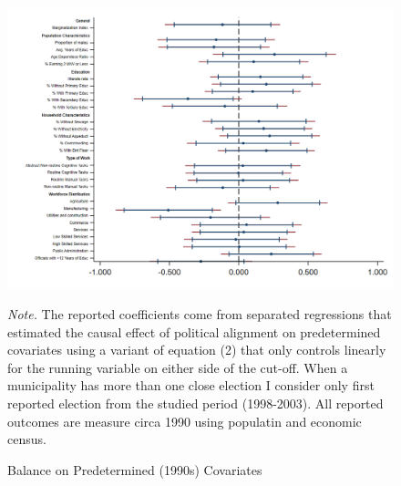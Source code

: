 \documentclass[dv_diss_main.tex]{subfiles}
\begin{document}
\begin{figure}[h]
	\begin{center}
			\includegraphics[width=0.8\linewidth]{figures/Balance_1998_2003.png}
			\caption{Balance on Predetermined (1990s) Covariates}\label{fig:baselinebalance}
	\end{center}
	\vspace{0.5em}
	\begin{figurenotes}
    \footnotesize	
	\textit{Note. }The reported coefficients come from separated regressions that estimated the causal effect of political alignment on predetermined covariates using a variant of equation (2) that only controls linearly for the running variable on either side of the cut-off.  When a municipality has more than one close election I consider only first reported election from the studied period (1998-2003).  All reported outcomes are measure circa 1990 using populatin and economic census. 
	\end{figurenotes}
\end{figure}

\newpage
\end{document}
